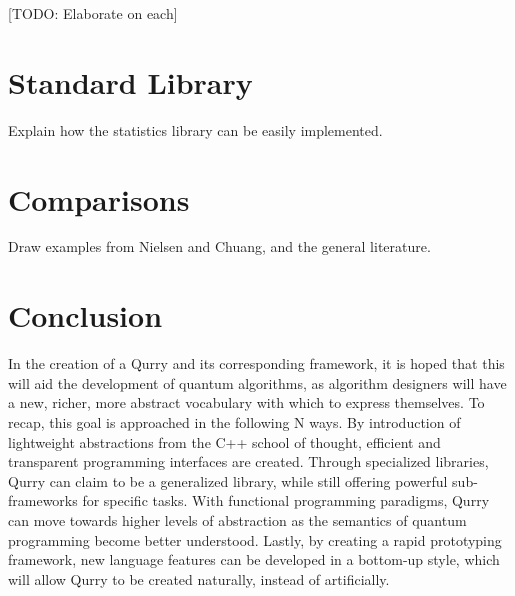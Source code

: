 \documentclass[journal]{IEEEtran}
\begin{document}
    [TODO: Elaborate on each]

\section{Standard Library}

    Explain how the statistics library can be easily implemented.

\section{Comparisons}

    Draw examples from Nielsen and Chuang, and the general literature.

\section{Conclusion}

In the creation of a Qurry and its corresponding framework, it is hoped that this will aid the development of quantum algorithms, as algorithm designers will have a new, richer, more abstract vocabulary with which to express themselves.
To recap, this goal is approached in the following N ways.
By introduction of lightweight abstractions from the C++ school of thought, efficient and transparent programming interfaces are created.
Through specialized libraries, Qurry can claim to be a generalized library, while still offering powerful sub-frameworks for specific tasks.
With functional programming paradigms, Qurry can move towards higher levels of abstraction as the semantics of quantum programming become better understood.
Lastly, by creating a rapid prototyping framework, new language features can be developed in a bottom-up style, which will allow Qurry to be created naturally, instead of artificially.
\end{document}
